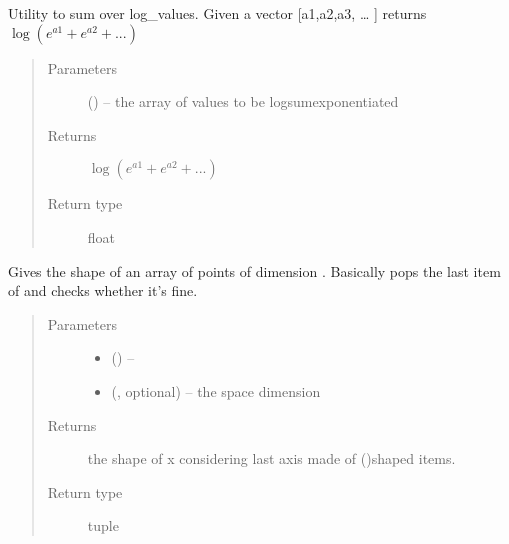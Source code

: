 \documentclass[letterpaper,10pt,english,openany,oneside]{sphinxmanual}
\begin{document}

\begin{fulllineitems}
\label{\detokenize{autogen:utils.logsumexp}}
Utility to sum over log\_values.
Given a  vector {[}a1,a2,a3, … {]} returns \(\log{(e^{a1} + e^{a2} + ...)}\)
\begin{quote}\begin{description}
\item[{Parameters}] \leavevmode
{} () – the array of values to be log\sphinxhyphen{}sum\sphinxhyphen{}exponentiated

\item[{Returns}] \leavevmode
\(\log{(e^{a1} + e^{a2} + ...)}\)

\item[{Return type}] \leavevmode
float

\end{description}\end{quote}

\end{fulllineitems}


\begin{fulllineitems}
\label{\detokenize{autogen:utils.pointshape}}
Gives the shape of an array of points of dimension .
Basically pops the last item of  and checks whether it’s fine.
\begin{quote}\begin{description}
\item[{Parameters}] \leavevmode\begin{itemize}
\item {} 
 () – 

\item {} 
 (, optional) – the space dimension

\end{itemize}

\item[{Returns}] \leavevmode
the shape of x considering last axis made of ()\sphinxhyphen{}shaped items.

\item[{Return type}] \leavevmode
tuple

\end{description}\end{quote}

\end{fulllineitems}
\end{document}
